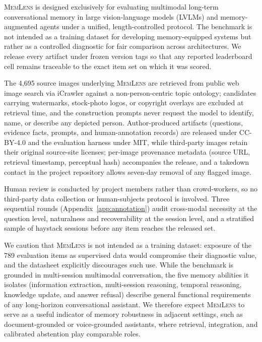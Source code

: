 \documentclass{llmxive}
\providecommand{\bench}{\textsc{MemLens}}
\begin{document}
\bench{} is designed exclusively for evaluating multimodal long-term conversational memory in large vision-language models (LVLMs) and memory-augmented agents under a unified, length-controlled protocol. The benchmark is not intended as a training dataset for developing memory-equipped systems but rather as a controlled diagnostic for fair comparison across architectures. We release every artifact under frozen version tags so that any reported leaderboard cell remains traceable to the exact item set on which it was scored.

The 4{,}695 source images underlying \bench{} are retrieved from public web image search via iCrawler against a non-person-centric topic ontology; candidates carrying watermarks, stock-photo logos, or copyright overlays are excluded at retrieval time, and the construction prompts never request the model to identify, name, or describe any depicted person. Author-produced artifacts (questions, evidence facts, prompts, and human-annotation records) are released under CC-BY-4.0 and the evaluation harness under MIT, while third-party images retain their original source-site licenses; per-image provenance metadata (source URL, retrieval timestamp, perceptual hash) accompanies the release, and a takedown contact in the project repository allows seven-day removal of any flagged image.

Human review is conducted by project members rather than crowd-workers, so no third-party data collection or human-subjects protocol is involved. Three sequential rounds (Appendix~\ref{app:annotation}) audit cross-modal necessity at the question level, naturalness and recoverability at the session level, and a stratified sample of haystack sessions before any item reaches the released set.

We caution that \bench{} is not intended as a training dataset: exposure of the 789 evaluation items as supervised data would compromise their diagnostic value, and the datasheet explicitly discourages such use. While the benchmark is grounded in multi-session multimodal conversation, the five memory abilities it isolates (information extraction, multi-session reasoning, temporal reasoning, knowledge update, and answer refusal) describe general functional requirements of any long-horizon conversational assistant. We therefore expect \bench{} to serve as a useful indicator of memory robustness in adjacent settings, such as document-grounded or voice-grounded assistants, where retrieval, integration, and calibrated abstention play comparable roles.
\end{document}
